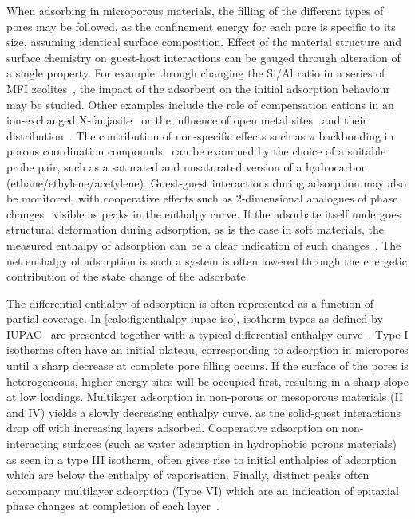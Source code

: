 When adsorbing in microporous materials, the filling of the
different types of pores may be followed, as the confinement
energy for each pore is specific to its size, assuming identical
surface composition.
Effect of the material structure and surface chemistry
on guest-host interactions can be gauged through alteration of
a single property. For example through changing the Si/Al ratio
in a series of MFI zeolites~\cite{llewellynAdsorptionMFItypeZeolites1993},
the impact of the adsorbent on the initial adsorption behaviour
may be studied.
Other examples include the role of compensation cations in an
ion-exchanged X-faujasite~\cite{maurinAdsorptionArgonNitrogen2005, %
	maurinInfluenceExtraFrameworkCations2005}
or the influence of open metal sites~\cite{grajciarUnderstandingCOAdsorption2011}
and their distribution~\cite{yoonControlledReducibilityMetalOrganic2010}.
The contribution of non-specific effects such as \( \pi \)
backbonding in porous coordination compounds~\cite{rubesAdsorptionPropanePropylene2013}
can be examined by the choice of a suitable probe pair, such as a saturated
and unsaturated version of a hydrocarbon (ethane/ethylene/acetylene).
Guest-guest interactions during adsorption may also be monitored,
with cooperative effects such as 2-dimensional analogues of phase
changes~\cite{rouquerolCalorimetricEvidenceBidimensional1977}
visible as peaks in the enthalpy curve.
If the adsorbate itself undergoes structural deformation during adsorption,
as is the case in soft materials, the measured enthalpy of
adsorption can be a clear indication of such
changes~\cite{bourrellyDifferentAdsorptionBehaviors2005}.
The net enthalpy of adsorption is such a system is often
lowered through the energetic contribution of the state
change of the adsorbate.

The differential enthalpy of adsorption is often represented as a
function of partial coverage. In \autoref{calo:fig:enthalpy-iupac-iso},
isotherm types as defined by \gls{IUPAC}~\cite{thommesPhysisorptionGasesSpecial2015}
are presented together with a typical differential enthalpy
curve~\cite{llewellynGasAdsorptionMicrocalorimetry2005}. 
Type I isotherms often
have an initial plateau, corresponding to adsorption in micropores
until a sharp decrease at complete pore filling occurs. If the surface
of the pores is heterogeneous, higher energy sites will be occupied
first, resulting in a sharp slope at low loadings. Multilayer
adsorption in non-porous or mesoporous materials (II and IV) yields
a slowly decreasing enthalpy curve, as the solid-guest interactions
drop off with increasing layers adsorbed. Cooperative adsorption
on non-interacting surfaces (such as water adsorption in hydrophobic porous
materials) as seen in a type III isotherm, often gives rise to initial 
enthalpies of adsorption which are below the enthalpy of vaporisation.
Finally, distinct peaks often accompany multilayer adsorption (Type VI)
which are an indication of epitaxial phase
changes at completion of each layer~\cite{llewellynAdsorptionMFItypeZeolites1993, %
	llewellynAdsorptionMFItypeZeolites1993a, %
	rouquerolCalorimetricEvidenceBidimensional1977}.

